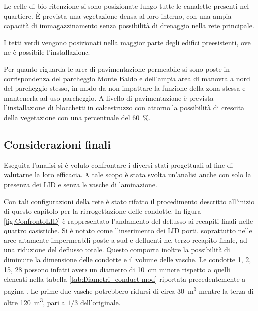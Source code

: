 Le celle di bio-ritenzione si sono posizionate lungo tutte le canalette presenti nel quartiere. 
È prevista una vegetazione densa al loro interno, con una ampia capacità di immagazzinamento senza possibilità di drenaggio nella rete principale.

I tetti verdi vengono posizionati nella maggior parte degli edifici preesistenti, ove ne è possibile l'installazione. 

Per quanto riguarda le aree di pavimentazione permeabile si sono poste in corrispondenza del parcheggio Monte Baldo e dell'ampia area di manovra a nord del parcheggio stesso, in modo da non impattare la funzione della zona stessa e mantenerla ad uso parcheggio.
A livello di pavimentazione è prevista l'installazione di blocchetti in calcestruzzo con attorno la possibilità di crescita della vegetazione con una percentuale del \SI{60}{\percent}.

\subsection{Considerazioni finali}
Eseguita l'analisi si è voluto confrontare i diversi stati progettuali al fine di valutarne la loro  efficacia. 
A tale scopo è stata svolta un'analisi anche con solo la presenza dei LID e senza le vasche di laminazione.

Con tali configurazioni della rete è stato rifatto il procedimento descritto all'inizio di questo capitolo per la riprogettazione delle condotte. 
In figura \ref{fig:ConfrontoLID} è rappresentato l'andamento del deflusso ai recapiti finali nelle quattro casistiche.
Si è notato come l'inserimento dei LID porti, soprattutto nelle aree altamente impermeabili poste a sud e defluenti nel terzo recapito finale, ad una riduzione del deflusso totale. 
Questo comporta inoltre la possibilità di diminuire la dimensione delle condotte e il volume delle vasche. Le condotte 1, 2, 15, 28 possono infatti avere un diametro di \SI{10}{\centi\metre} minore rispetto a quelli elencati nella tabella \ref{tab:Diametri_conduct-mod} riportata precedentemente a pagina \pageref{tab:Diametri_conduct-mod}. 
Le prime due vasche potrebbero ridursi di circa \SI{30}{\metre\cubed} mentre la terza di oltre \SI{120}{\metre\cubed}, pari a $1/3$ dell'originale.

